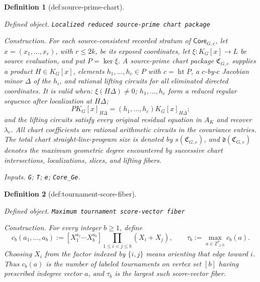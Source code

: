 \documentclass{article}
\newtheorem{definition}{Definition}
\begin{document}
\begin{definition}[def:source-prime-chart]\label{def:source-prime-chart}
\par\smallskip\noindent\emph{Defined object.} \texttt{Localized reduced source-\allowbreak{}prime chart package}
\par\smallskip\noindent\emph{Construction.} For each source-consistent recorded stratum of \(\mathsf{Core}_{G,e}\), let \(x=(x_1,\ldots,x_r)\), with \(r\leq2k\), be its exposed coordinates, let \(\xi:K_G[x]\to L\) be source evaluation, and put \(P=\ker\xi\). A source-prime chart package \(\mathfrak C_{G,e}\) supplies a product \(H\in K_G[x]\), elements \(h_1,\ldots,h_c\in P\) with \(c=\operatorname{ht}P\), a \(c\)-by-\(c\) Jacobian minor \(\Delta\) of the \(h_i\), and rational lifting circuits for all eliminated directed coordinates. It is valid when: \(\xi(H\Delta)\neq0\); \(h_1,\ldots,h_c\) form a reduced regular sequence after localization at \(H\Delta\); 
\[
P K_G[x]_{H\Delta}=(h_1,\ldots,h_c)K_G[x]_{H\Delta};
\]
and the lifting circuits satisfy every original residual equation in \(A_K\) and recover \(\lambda_e\). All chart coefficients are rational arithmetic circuits in the covariance entries. The total chart straight-line-program size is denoted by \(s(\mathfrak C_{G,e})\), and \(\mathfrak d(\mathfrak C_{G,e})\) denotes the maximum geometric degree encountered by successive chart intersections, localizations, slices, and lifting fibers.
\par\smallskip\noindent\emph{Inputs.} \texttt{G}; \texttt{T}; \texttt{e}; \texttt{Core\_\allowbreak{}Ge}.
\end{definition}

\begin{definition}[def:tournament-score-fiber]\label{def:tournament-score-fiber}
\par\smallskip\noindent\emph{Defined object.} \texttt{Maximum tournament score-\allowbreak{}vector fiber}
\par\smallskip\noindent\emph{Construction.} For every integer \(b\geq 1\), define
\[
 c_b(a_1,\ldots,a_b)
 :=[X_1^{a_1}\cdots X_b^{a_b}]
 \prod_{1\leq i<j\leq b}(X_i+X_j),
 \qquad
 \tau_b:=\max_{a\in\mathbb Z_{\geq0}^{b}}c_b(a).
\]
Choosing \(X_i\) from the factor indexed by \(\{i,j\}\) means orienting that edge toward \(i\). Thus \(c_b(a)\) is the number of labeled tournaments on vertex set \([b]\) having prescribed indegree vector \(a\), and \(\tau_b\) is the largest such score-vector fiber.
\end{definition}
\end{document}

